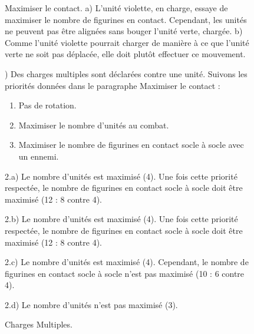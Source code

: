 \begin{figure}[!htbp]
\centering
\def\svgwidth{\textwidth}

\caption{Maximiser le contact.\vspace*{10pt}\newline
a) L'unité violette, en charge, essaye de maximiser le nombre de figurines en contact. Cependant, les unités ne peuvent pas être alignées sans bouger l'unité verte, chargée.\vspace*{10pt}\newline
b) Comme l'unité violette pourrait charger de manière à ce que l'unité verte ne soit pas déplacée, elle doit plutôt effectuer ce mouvement.}
\label{figure/chargealignment}
\end{figure}

\newcommand{\multiplechargesCharge}{\flufffont{Charge !}}
\newcommand{\multiplechargesOne}{1)}
\newcommand{\multiplechargesTwoA}{2.a)}
\newcommand{\multiplechargesTwoB}{2.b)}
\newcommand{\multiplechargesTwoC}{2.c)}
\newcommand{\multiplechargesTwoD}{2.d)}

\begin{figure}[!htbp]
\begin{minipage}{0.5\textwidth}
\def\svgwidth{\textwidth}

\end{minipage}\hfill\begin{minipage}{0.47\textwidth}
\caption{Charges Multiples.}
\label{figure/multiplecharges}

\vspace*{10pt}
) Des charges multiples sont déclarées contre une unité. Suivons les priorités données dans le paragraphe Maximiser le contact :
\begin{enumerate}
\item Pas de rotation.
\item Maximiser le nombre d'unités au combat.
\item Maximiser le nombre de figurines en contact socle à socle avec un ennemi.
\end{enumerate}

\vspace*{10pt}
\noindent 2.a) Le nombre d'unités est maximisé (4). Une fois cette priorité respectée, le nombre de figurines en contact socle à socle doit être maximisé (12 : 8 contre 4).

\vspace*{10pt}
\noindent 2.b) Le nombre d'unités est maximisé (4). Une fois cette priorité respectée, le nombre de figurines en contact socle à socle doit être maximisé (12 : 8 contre 4).

\vspace*{10pt}
\noindent 2.c) Le nombre d'unités est maximisé (4). Cependant, le nombre de figurines en contact socle à socle n'est pas maximisé (10 : 6 contre 4).

\vspace*{10pt}
\noindent 2.d) Le nombre d'unités n'est pas maximisé (3).
\end{minipage}
\end{figure}

